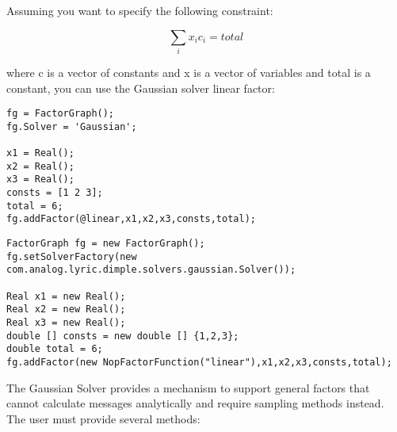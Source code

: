 
Assuming you want to specify the following constraint:

\[
 \sum_i x_i c_i = total
\]

where c is a vector of constants and x is a vector of variables and total is a constant, you can use the Gaussian solver linear factor:

\ifmatlab
\begin{lstlisting}
fg = FactorGraph();
fg.Solver = 'Gaussian';

x1 = Real();
x2 = Real();
x3 = Real();
consts = [1 2 3];
total = 6;
fg.addFactor(@linear,x1,x2,x3,consts,total);
\end{lstlisting}
\fi

\ifjava
\begin{lstlisting}
FactorGraph fg = new FactorGraph();
fg.setSolverFactory(new com.analog.lyric.dimple.solvers.gaussian.Solver());

Real x1 = new Real();
Real x2 = new Real();
Real x3 = new Real();
double [] consts = new double [] {1,2,3};
double total = 6;
fg.addFactor(new NopFactorFunction("linear"),x1,x2,x3,consts,total);
\end{lstlisting}
\fi




The Gaussian Solver provides a mechanism to support general factors that cannot calculate messages analytically and require sampling methods instead. The user must provide several methods:

